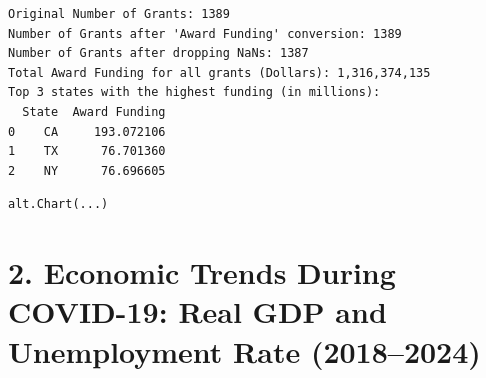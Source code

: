 \documentclass[
  letterpaper,
  DIV=11,
  numbers=noendperiod]{scrartcl}
\begin{document}
\begin{verbatim}
Original Number of Grants: 1389
Number of Grants after 'Award Funding' conversion: 1389
Number of Grants after dropping NaNs: 1387
Total Award Funding for all grants (Dollars): 1,316,374,135
Top 3 states with the highest funding (in millions):
  State  Award Funding
0    CA     193.072106
1    TX      76.701360
2    NY      76.696605
\end{verbatim}

\begin{verbatim}
alt.Chart(...)
\end{verbatim}

\section{2. Economic Trends During COVID-19: Real GDP and Unemployment
Rate
(2018--2024)}\label{economic-trends-during-covid-19-real-gdp-and-unemployment-rate-20182024}
\end{document}
